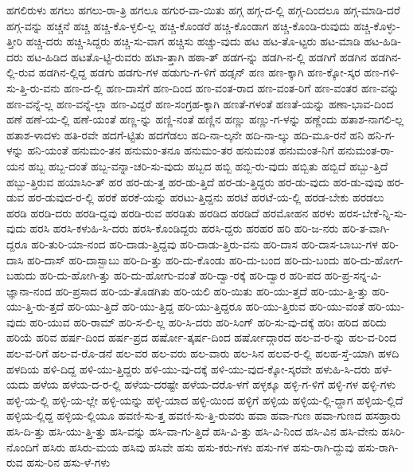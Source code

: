 {ಹಗಲಿರುಳು
ಹಗಲು
ಹಗಲು-ರಾ-ತ್ರಿ
ಹಗಲೂ
ಹಗುರ-ವಾ-ಯಿತು
ಹಗ್ಗ
ಹಗ್ಗ-ದ-ಲ್ಲಿ
ಹಗ್ಗ-ದಿಂದಲೂ
ಹಗ್ಗ-ಮಾಡಿ-ದರೆ
ಹಗ್ಗ-ವನ್ನು
ಹಚ್ಚನೆ
ಹಚ್ಚಿ
ಹಚ್ಚಿ-ಕೊ-ಳ್ಳಲಿ-ಲ್ಲ
ಹಚ್ಚಿ-ಕೊಂಡರೆ
ಹಚ್ಚಿ-ಕೊಂಡಾಗ
ಹಚ್ಚಿ-ಕೊಂಡಿ-ರುವುದು
ಹಚ್ಚಿ-ಕೊಳ್ಳು-ತ್ತೀರಿ
ಹಚ್ಚಿ-ದರು
ಹಚ್ಚಿ-ಸಿದ್ದರು
ಹಚ್ಚಿ-ಸು-ವಾಗ
ಹಚ್ಚಿಸು
ಹಚ್ಚು-ವುದು
ಹಟ
ಹಟ-ತೊ-ಟ್ಟರು
ಹಟ-ಮಾಡಿ
ಹಟ-ಹಿಡಿ-ದರು
ಹಟ-ಹಿಡಿದ
ಹಟತೊ-ಟ್ಟಿ-ರುವರು
ಹಟಾ-ತ್ತಾಗಿ
ಹಠಾ-ತ್
ಹಡಗ-ನ್ನು
ಹಡಗಿ-ನ-ಲ್ಲಿ
ಹಡಗಿಗೆ
ಹಡಗಿನ
ಹಡಗಿನ-ಲ್ಲಿ-ರುವ
ಹಡಗಿನ-ಲ್ಲಿದ್ದ
ಹಡಗು
ಹಡಗು-ಗಳ
ಹಡುಗು-ಗ-ಳಿಗೆ
ಹಡ್ಸನ್
ಹಣ
ಹಣ-ಕ್ಕಾಗಿ
ಹಣ-ಕ್ಕೋ-ಸ್ಕರ
ಹಣ-ಗಳಿ-ಸು-ತ್ತಿ-ರು-ವನು
ಹಣ-ದ-ಲ್ಲಿ
ಹಣ-ದಾಸೆಗೆ
ಹಣ-ದಿಂದ
ಹಣ-ವಂತ-ರಾದ
ಹಣ-ವಂತ-ರಿಗೆ
ಹಣ-ವಂತರ
ಹಣ-ವನ್ನು
ಹಣ-ವನ್ನೆ-ಲ್ಲ
ಹಣ-ವನ್ನೆ-ಲ್ಲಾ
ಹಣ-ವಿದ್ದರೆ
ಹಣ-ಸಂಗ್ರಹ-ಕ್ಕಾಗಿ
ಹಣತೆ-ಗಳಂತೆ
ಹಣತೆ-ಯನ್ನು
ಹಣಾ-ಭಾವ-ದಿಂದ
ಹಣೆ
ಹಣೆ-ಯ-ಲ್ಲಿ
ಹಣೆ-ಯಂತೆ
ಹಣ್ಣ-ನ್ನು
ಹಣ್ಣಿ-ನಂತೆ
ಹಣ್ಣಿನ
ಹಣ್ಣು
ಹಣ್ಣು-ಗ-ಳನ್ನು
ಹಣ್ಣೆಂದು
ಹತಾಶ-ನಾಗಲಿ-ಲ್ಲ
ಹತಾಶ-ಳಾದಳು
ಹತಿ-ರವೇ
ಹದಗೆ-ಟ್ಟಿತು
ಹದಗೆಡಲು
ಹದಿ-ನಾ-ಲ್ಕನೇ
ಹದಿ-ನಾ-ಲ್ಕು
ಹದಿ-ಮೂ-ರನೆ
ಹನಿ
ಹನಿ-ಗ-ಳನ್ನು
ಹನಿ-ಯಂತೆ
ಹನುಮಂ-ತನ
ಹನುಮಂ-ತನೂ
ಹನುಮಂ-ತರ
ಹನುಮಂತ
ಹನುಮಂತ-ನಿಗೆ
ಹನುಮಂತ-ರಾ-ಯನ
ಹಬ್ಬ
ಹಬ್ಬ-ದಂತೆ
ಹಬ್ಬ-ವನ್ನಾ-ಚರಿ-ಸು-ವುದು
ಹಬ್ಬದ
ಹಬ್ಬಿ
ಹಬ್ಬಿ-ರು-ವುದು
ಹಬ್ಬಿತು
ಹಬ್ಬಿದೆ
ಹಬ್ಬು-ತ್ತಿದೆ
ಹಬ್ಬು-ತ್ತಿರುವ
ಹಯಾಸಿಂ-ತ್
ಹರ
ಹರ-ಡು-ತ್ತ
ಹರ-ಡು-ತ್ತಿದೆ
ಹರ-ಡು-ತ್ತಿದ್ದರು
ಹರ-ಡು-ವುದು
ಹರ-ಡು-ವುವು
ಹರ-ಡುವ
ಹರ-ಡುವುದ-ರ-ಲ್ಲಿ
ಹರಕೆ
ಹರಕೆ-ಯನ್ನು
ಹರಟು-ತ್ತಿದ್ದನು
ಹರಟೆ
ಹರಟೆ-ಯ-ಲ್ಲಿ
ಹರಡ-ಬೇಕು
ಹರಡಲು
ಹರಡಿ
ಹರಡಿ-ದರು
ಹರಡಿ-ದ್ದವು
ಹರಡಿ-ರುವ
ಹರಡಿತು
ಹರಡಿದ
ಹರಡಿದೆ
ಹರಮೋಹನ
ಹರಳು
ಹರಸ-ಬೇಕೆ-ನ್ನಿ-ಸು-ವುದು
ಹರಸಿ
ಹರಸಿ-ಕಳುಹಿ-ಸಿ-ದರು
ಹರಸಿ-ಕೊಂಡಿದ್ದರು
ಹರಸಿ-ದ್ದರು
ಹರಹರ
ಹರಿ
ಹರಿ-ಜ-ನರು
ಹರಿ-ತ-ವಾಗಿ-ದ್ದರೂ
ಹರಿ-ತುರಿ-ಯಾ-ನಂದ
ಹರಿ-ದಾಡು-ತ್ತಿದ್ದವು
ಹರಿ-ದಾಡು-ತ್ತಿರು-ವನು
ಹರಿ-ದಾಸ
ಹರಿ-ದಾಸ-ಬಾಬು-ಗಳ
ಹರಿ-ದಾಸಿ
ಹರಿ-ದಾಸ್
ಹರಿ-ದಾಸ್ಬಾಬು
ಹರಿ-ದಿ-ತ್ತು
ಹರಿ-ದು-ಕೊಂಡು
ಹರಿ-ದು-ಬಂದ
ಹರಿ-ದು-ಬಂದು
ಹರಿ-ದು-ಹೋಗ-ಬಹುದು
ಹರಿ-ದು-ಹೋಗಿ-ತ್ತು
ಹರಿ-ದು-ಹೋಗು-ವಂತೆ
ಹರಿ-ದ್ವಾ-ರಕ್ಕೆ
ಹರಿ-ದ್ವಾರ
ಹರಿ-ಪದ
ಹರಿ-ಪ್ರ-ಸನ್ನ-ವಿ-ಜ್ಞಾನಾ-ನಂದ
ಹರಿ-ಪ್ರಸಾದ
ಹರಿ-ಯ-ತೊಡಗಿತು
ಹರಿ-ಯಲಿ
ಹರಿ-ಯಿತು
ಹರಿ-ಯು-ತ್ತದೆ
ಹರಿ-ಯು-ತ್ತಿ-ತ್ತು
ಹರಿ-ಯು-ತ್ತಿ-ರು-ತ್ತದೆ
ಹರಿ-ಯು-ತ್ತಿದೆ
ಹರಿ-ಯು-ತ್ತಿದ್ದ
ಹರಿ-ಯು-ತ್ತಿದ್ದರೂ
ಹರಿ-ಯು-ತ್ತಿರುವ
ಹರಿ-ಯು-ವಂತೆ
ಹರಿ-ಯು-ವುದು
ಹರಿ-ಯುವ
ಹರಿ-ರಾಮ್
ಹರಿ-ಸ-ಲಿ-ಲ್ಲ
ಹರಿ-ಸಿ-ದರು
ಹರಿ-ಸಿಂಗ್
ಹರಿ-ಸು-ವು-ದಕ್ಕೆ
ಹರಿಃ
ಹರಿದ
ಹರಿದು
ಹರಿಯೆ
ಹರಿವ
ಹರ್ಷ-ದಿಂದ
ಹರ್ಷ-ಪ್ರದ
ಹರ್ಷೋ-ತ್ಕರ್ಷ-ದಿಂದ
ಹರ್ಷೋದ್ಗಾರದ
ಹಲ-ವ-ರ-ನ್ನು
ಹಲ-ವ-ರಿಂದ
ಹಲ-ವ-ರಿಗೆ
ಹಲ-ವ-ರೊ-ಡನೆ
ಹಲ-ವರ
ಹಲ-ವರು
ಹಲ-ವಾರು
ಹಲ-ಸಿನ
ಹಲವ-ರ-ಲ್ಲಿ
ಹಲಹ-ಸ್ತೆ-ಯಾಗಿ
ಹಳದಿ
ಹಳದಿಯ
ಹಳಿ-ದಿದ್ದ
ಹಳಿ-ಯು-ತ್ತಿದ್ದರು
ಹಳಿ-ಯು-ವು-ದಕ್ಕೆ
ಹಳಿ-ಯು-ವುದ-ಕ್ಕೋ-ಸ್ಕರವೇ
ಹಳುಹಿ-ಸಿ-ದರು
ಹಳೆ-ಯದು
ಹಳೆಯ
ಹಳೆಯ-ದ-ರ-ಲ್ಲಿ
ಹಳೆಯ-ದರಷ್ಟೇ
ಹಳೆಯ-ದರೊ-ಳಗೆ
ಹಳ್ಳಕ್ಕೂ
ಹಳ್ಳಿ-ಗ-ಳಿಗೆ
ಹಳ್ಳಿ-ಗಳ
ಹಳ್ಳಿ-ಗಳು
ಹಳ್ಳಿ-ಯ-ಲ್ಲಿ
ಹಳ್ಳಿ-ಯ-ಲ್ಲೇ
ಹಳ್ಳಿ-ಯನ್ನು
ಹಳ್ಳಿ-ಯಾದ
ಹಳ್ಳಿ-ಯಿಂದ
ಹಳ್ಳಿಗೆ
ಹಳ್ಳಿಯ
ಹಳ್ಳಿಯ-ಲ್ಲಿ-ದ್ದಾಗ
ಹಳ್ಳಿಯ-ಲ್ಲಿದೆ
ಹಳ್ಳಿಯ-ಲ್ಲಿದ್ದ
ಹಳ್ಳಿಯ-ಲ್ಲಿಯೂ
ಹವಣಿ-ಸು-ತ್ತ
ಹವಣಿ-ಸು-ತ್ತಿ-ರುವರು
ಹವಾ
ಹವಾ-ಗುಣ
ಹವಾ-ಗುಣದ
ಹಸಹ್ರಾರು
ಹಸಿ-ದಿ-ತ್ತು
ಹಸಿ-ಯು-ತ್ತಿ-ತ್ತು
ಹಸಿ-ವನ್ನು
ಹಸಿ-ವಾ-ಗು-ತ್ತಿದೆ
ಹಸಿ-ವಿ-ತ್ತು
ಹಸಿ-ವಿ-ನಿಂದ
ಹಸಿ-ವಿನ
ಹಸಿ-ವೇನು
ಹಸಿರಿ-ನೊಂದಿಗೆ
ಹಸಿರು
ಹಸಿರು-ಮಯ
ಹಸಿವು
ಹಸಿವೇ
ಹಸು
ಹಸು-ಕರು-ಗಳು
ಹಸು-ಗಳ
ಹಸು-ರಾಗಿ-ದ್ದುವು
ಹಸು-ರಾಗಿ-ರುವ
ಹಸು-ರಿನ
ಹಸು-ಳೆ-ಗಳು
}
